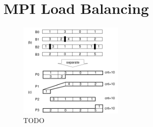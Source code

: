 \section{MPI Load Balancing}
\label{sec:mpi_bal}

\begin{figure}[!htpb]
	\begin{center}
		\includegraphics[width=0.45\textwidth]{images/mpi_bal}
	\end{center}
	\caption{TODO}
	\label{fig:mpi}
\end{figure}
